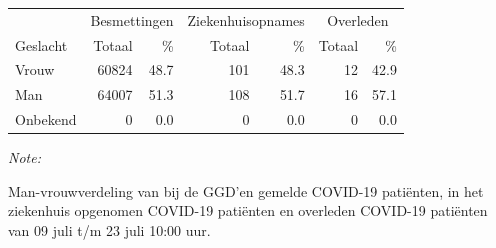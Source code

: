 \documentclass[
  english,
  man,floatsintext]{apa6}
\begin{document}
\begin{table}
\centering\begingroup\fontsize{11}{13}\selectfont

\begin{threeparttable}
\begin{tabular}{lrrrrrr}
\toprule
\multicolumn{1}{c}{ } & \multicolumn{2}{c}{Besmettingen} & \multicolumn{2}{c}{Ziekenhuisopnames} & \multicolumn{2}{c}{Overleden} \\
\cmidrule(l{3pt}r{3pt}){2-3} \cmidrule(l{3pt}r{3pt}){4-5} \cmidrule(l{3pt}r{3pt}){6-7}
Geslacht & Totaal & \% & Totaal & \% & Totaal & \%\\
\midrule
Vrouw & 60824 & 48.7 & 101 & 48.3 & 12 & 42.9\\
Man & 64007 & 51.3 & 108 & 51.7 & 16 & 57.1\\
Onbekend & 0 & 0.0 & 0 & 0.0 & 0 & 0.0\\
\bottomrule
\end{tabular}
\begin{tablenotes}
\item \textit{Note: } 
\item Man-vrouwverdeling van bij de GGD’en gemelde COVID-19 patiënten, in het ziekenhuis opgenomen COVID-19 patiënten en overleden COVID-19 patiënten van 09 juli t/m 23 juli 10:00 uur.
\end{tablenotes}
\end{threeparttable}
\endgroup{}
\end{table}
\newpage
\end{document}
